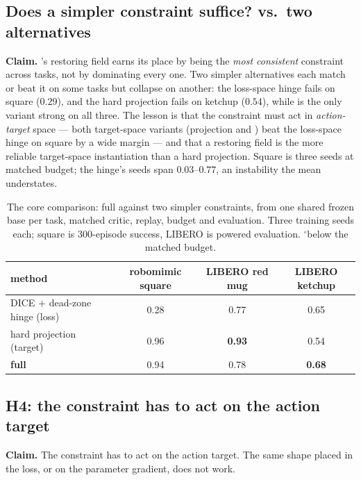 \subsection{Does a simpler constraint suffice? \method{} vs.\ two alternatives}
\label{sec:exp1}

\textbf{Claim.} \method{}'s restoring field earns its place by being the
\emph{most consistent} constraint across tasks, not by dominating every one.
Two simpler alternatives each match or beat it on some tasks but collapse on
another: the loss-space hinge fails on square ($0.29$), and the hard
projection fails on ketchup ($0.54$), while \method{} is the only variant
strong on all three. The lesson is that the constraint must act in
\emph{action-target} space --- both target-space variants (projection and
\method{}) beat the loss-space hinge on square by a wide margin --- and that
a restoring field is the more reliable target-space instantiation than a hard
projection.
Square is three seeds at matched budget; the hinge's seeds span
$0.03$--$0.77$, an instability the mean understates.

\begin{table}[t]
\centering
\caption{The core comparison: full \method{} against two simpler
constraints, from one shared frozen base per task, matched critic, replay,
budget and evaluation. Three training seeds each; square is $300$-episode
success, LIBERO is powered evaluation. $^{\circ}$below the matched budget.}
\label{tab:exp1}
\small
\begin{tabular}{lccc}
\toprule
method & robomimic square & LIBERO red mug & LIBERO ketchup \\
\midrule
DICE $+$ dead-zone hinge (loss)     & 0.28 & 0.77 & 0.65 \\
hard projection (target)            & 0.96 & \textbf{0.93} & 0.54 \\
\textbf{full \method{}}             & 0.94 & 0.78 & \textbf{0.68} \\
\bottomrule
\end{tabular}
\end{table}

\subsection{H4: the constraint has to act on the action target}

\label{sec:exp-locus}

\textbf{Claim.} The constraint has to act on the action target. The same
shape placed in the loss, or on the parameter gradient, does not work.

